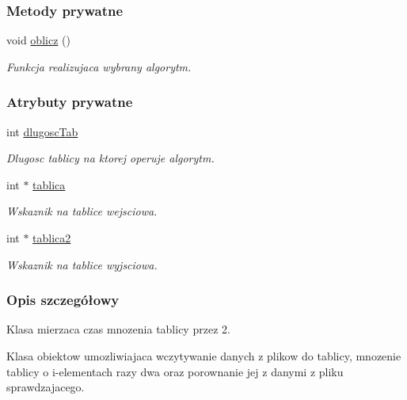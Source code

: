 \subsubsection*{Metody prywatne}
\begin{DoxyCompactItemize}
\item 
void \hyperlink{class_tablice_aee37b03e9711269a41148d5a9e8155d3}{oblicz} ()
\begin{DoxyCompactList}\small\item\em Funkcja realizujaca wybrany algorytm. \end{DoxyCompactList}\end{DoxyCompactItemize}
\subsubsection*{Atrybuty prywatne}
\begin{DoxyCompactItemize}
\item 
int \hyperlink{class_tablice_a6348e559c75b34c1a6006843c47fc7f1}{dlugosc\-Tab}
\begin{DoxyCompactList}\small\item\em Dlugosc tablicy na ktorej operuje algorytm. \end{DoxyCompactList}\item 
int $\ast$ \hyperlink{class_tablice_afd068f784491928fd66d9028a1d08f15}{tablica}
\begin{DoxyCompactList}\small\item\em Wskaznik na tablice wejsciowa. \end{DoxyCompactList}\item 
int $\ast$ \hyperlink{class_tablice_a936c25baffe3fb6cb49ba334acaa9a85}{tablica2}
\begin{DoxyCompactList}\small\item\em Wskaznik na tablice wyjsciowa. \end{DoxyCompactList}\end{DoxyCompactItemize}


\subsubsection{Opis szczegółowy}
Klasa mierzaca czas mnozenia tablicy przez 2. 

Klasa obiektow umozliwiajaca wczytywanie danych z plikow do tablicy, mnozenie tablicy o i-\/elementach razy dwa oraz porownanie jej z danymi z pliku sprawdzajacego. 

